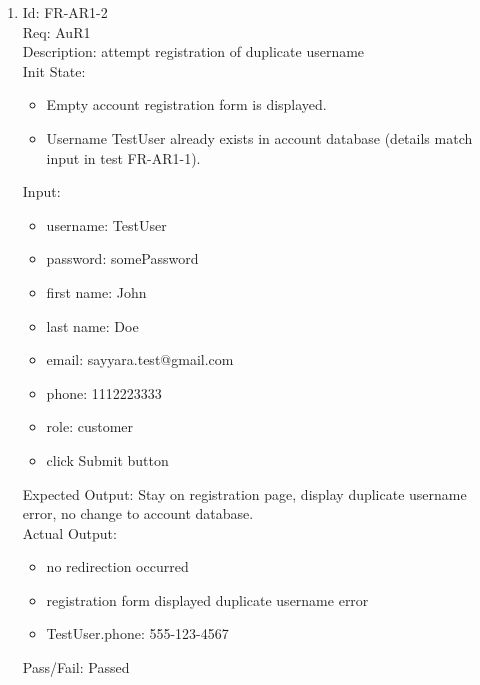 \documentclass[12pt, titlepage]{article}
\begin{document}
\begin{enumerate}
    \item Id: FR-AR1-2\\
    Req: AuR1\\
    Description: attempt registration of duplicate username\\
    Init State: \begin{itemize}[noitemsep,topsep=0pt]
        \item Empty account registration form is displayed.
        \item Username TestUser already exists in account database (details match input in test FR-AR1-1).
    \end{itemize}
    Input: \begin{itemize}[noitemsep,topsep=0pt]
        \item username: TestUser
        \item password: somePassword
        \item first name: John
        \item last name: Doe
        \item email: sayyara.test@gmail.com
        \item phone: 1112223333
        \item role: customer
        \item click Submit button
    \end{itemize}
    Expected Output: Stay on registration page, display duplicate username error, no change to account database.\\
    Actual Output: \begin{itemize}[noitemsep,topsep=0pt]
        \item no redirection occurred
        \item registration form displayed duplicate username error
        \item TestUser.phone: 555-123-4567
    \end{itemize}
    Pass/Fail: Passed


\end{enumerate}
\end{document}
